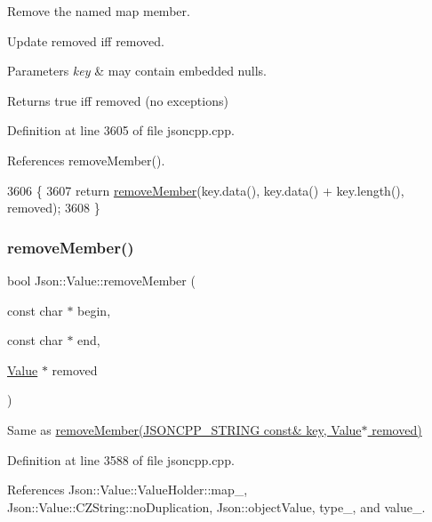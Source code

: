 Remove the named map member. 

Update \textquotesingle{}removed\textquotesingle{} iff removed. 
\begin{DoxyParams}{Parameters}
{\em key} & may contain embedded nulls. \\
\hline
\end{DoxyParams}
\begin{DoxyReturn}{Returns}
true iff removed (no exceptions) 
\end{DoxyReturn}


Definition at line 3605 of file jsoncpp.\+cpp.



References remove\+Member().


\begin{DoxyCode}
3606 \{
3607   \textcolor{keywordflow}{return} \hyperlink{class_json_1_1_value_aa52f7873b95d29627d6e83ba96f69aaa}{removeMember}(key.data(), key.data() + key.length(), removed);
3608 \}
\end{DoxyCode}
\mbox{\label{class_json_1_1_value_a49c91af727d6b4eb0af02a81bb2def87}} 
\subsubsection{\texorpdfstring{remove\+Member()}{removeMember()}\hspace{0.1cm}{\footnotesize\ttfamily [5/5]}}
{\footnotesize\ttfamily bool Json\+::\+Value\+::remove\+Member (\begin{DoxyParamCaption}\item[{const char $\ast$}]{begin,  }\item[{const char $\ast$}]{end,  }\item[{\hyperlink{class_json_1_1_value}{Value} $\ast$}]{removed }\end{DoxyParamCaption})}



Same as \hyperlink{class_json_1_1_value_ae385ecef98427970df525ee876e9f54a}{remove\+Member(\+J\+S\+O\+N\+C\+P\+P\+\_\+\+S\+T\+R\+I\+N\+G const\& key, Value$\ast$ removed)} 



Definition at line 3588 of file jsoncpp.\+cpp.



References Json\+::\+Value\+::\+Value\+Holder\+::map\+\_\+, Json\+::\+Value\+::\+C\+Z\+String\+::no\+Duplication, Json\+::object\+Value, type\+\_\+, and value\+\_\+.



